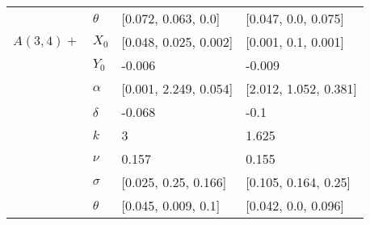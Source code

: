 \begin{tabular}{llll}
	& $\theta$ &    [0.072, 0.063, 0.0] &    [0.047, 0.0, 0.075] \\
	$A(3, 4)+$ & $X_0$ &  [0.048, 0.025, 0.002] &    [0.001, 0.1, 0.001] \\
	& $Y_0$ &                 -0.006 &                 -0.009 \\
	& $\alpha$ &  [0.001, 2.249, 0.054] &  [2.012, 1.052, 0.381] \\
	& $\delta$ &                 -0.068 &                   -0.1 \\
	& $k$ &                      3 &                  1.625 \\
	& $\nu$ &                  0.157 &                  0.155 \\
	& $\sigma$ &   [0.025, 0.25, 0.166] &   [0.105, 0.164, 0.25] \\
	& $\theta$ &    [0.045, 0.009, 0.1] &    [0.042, 0.0, 0.096] \\
	\bottomrule
\end{tabular}

